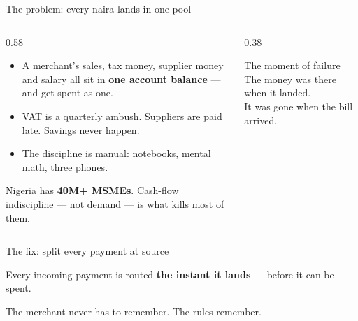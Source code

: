 \documentclass[aspectratio=169,11pt]{beamer}
\newcommand{\mutedtext}[1]{{\color{muted}#1}}
\begin{document}
\begin{frame}{The problem: every naira lands in one pool}
  \vspace{0.2cm}
  \begin{columns}[T]
    \begin{column}{0.58\textwidth}
      \begin{itemize}
        \item A merchant's sales, tax money, supplier money and salary all sit in \textbf{one account balance} — and get spent as one.
        \item VAT is a quarterly ambush. Suppliers are paid late. Savings never happen.
        \item The discipline is manual: notebooks, mental math, three phones.
      \end{itemize}
      \vspace{0.4cm}
      \mutedtext{Nigeria has \textbf{40M+ MSMEs}. Cash-flow indiscipline — not demand — is what kills most of them.}
    \end{column}
    \begin{column}{0.38\textwidth}
      \begin{alertblock}{The moment of failure}
        The money was there when it landed.\\It was gone when the bill arrived.
      \end{alertblock}
    \end{column}
  \end{columns}
\end{frame}

\begin{frame}{The fix: split every payment at source}
  {\large Every incoming payment is routed \textbf{the instant it lands} — before it can be spent.\par}
  \vspace{0.25cm}
  \begin{center}
  \end{center}
  \vspace{0.15cm}
  \begin{center}\mutedtext{The merchant never has to remember. The rules remember.}\end{center}
\end{frame}
\end{document}
